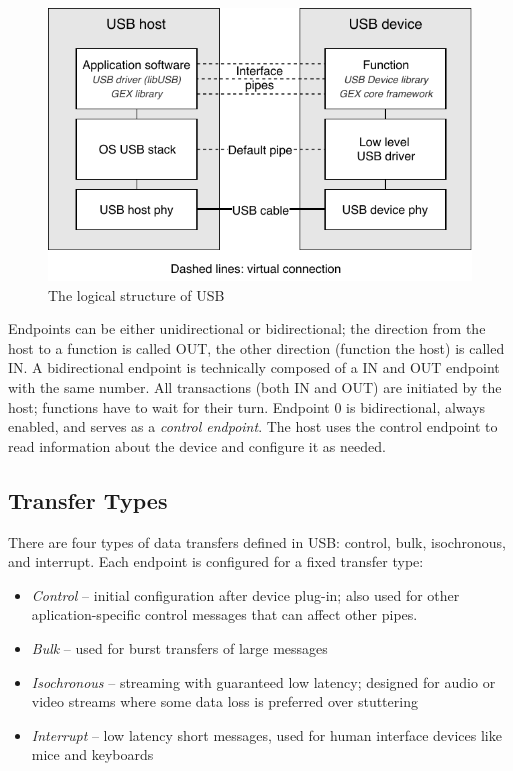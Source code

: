 \begin{figure}[h]
	\centering
	\includegraphics[scale=1] {img/usb-logical-redraw.pdf}
	\caption{\label{fig:usb-logical}The logical structure of USB}
\end{figure}

Endpoints can be either unidirectional or bidirectional; the direction from the host to a function is called OUT, the other direction (function the host) is called IN. A bidirectional endpoint is technically composed of a IN and OUT endpoint with the same number. All transactions (both IN and OUT) are initiated by the host; functions have to wait for their turn. Endpoint 0 is bidirectional, always enabled, and serves as a \textit{control endpoint}. The host uses the control endpoint to read information about the device and configure it as needed.

\subsection{Transfer Types}

There are four types of data transfers defined in \gls{USB}: control, bulk, isochronous, and interrupt. Each endpoint is configured for a fixed transfer type:

\begin{itemize}
	\item \textit{Control} -- initial configuration after device plug-in; also used for other aplication-specific control messages that can affect other pipes.
	\item \textit{Bulk} -- used for burst transfers of large messages
	\item \textit{Isochronous} -- streaming with guaranteed low latency; designed for audio or video streams where some data loss is preferred over stuttering
	\item \textit{Interrupt} -- low latency short messages, used for human interface devices like mice and keyboards
\end{itemize}

